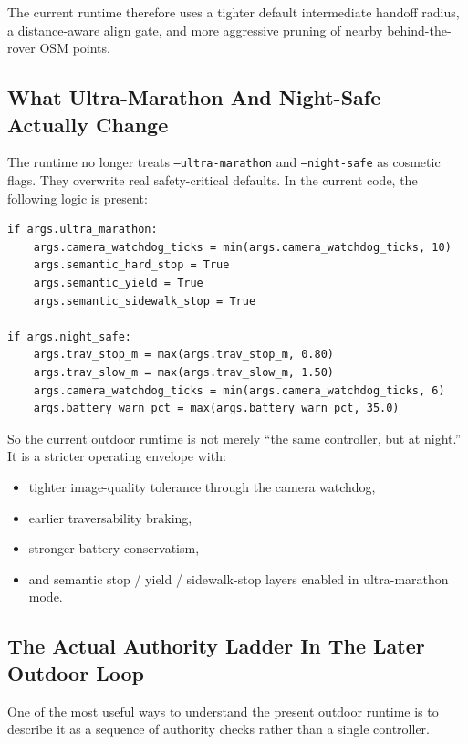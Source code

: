 \documentclass[11pt]{article}
\begin{document}
The current runtime therefore uses a tighter default intermediate handoff radius, a distance-aware align gate, and more aggressive pruning of nearby behind-the-rover OSM points.

\subsection*{What Ultra-Marathon And Night-Safe Actually Change}
The runtime no longer treats \texttt{--ultra-marathon} and \texttt{--night-safe} as cosmetic flags. They overwrite real safety-critical defaults. In the current code, the following logic is present:
\begin{verbatim}
if args.ultra_marathon:
    args.camera_watchdog_ticks = min(args.camera_watchdog_ticks, 10)
    args.semantic_hard_stop = True
    args.semantic_yield = True
    args.semantic_sidewalk_stop = True

if args.night_safe:
    args.trav_stop_m = max(args.trav_stop_m, 0.80)
    args.trav_slow_m = max(args.trav_slow_m, 1.50)
    args.camera_watchdog_ticks = min(args.camera_watchdog_ticks, 6)
    args.battery_warn_pct = max(args.battery_warn_pct, 35.0)
\end{verbatim}

So the current outdoor runtime is not merely ``the same controller, but at night.'' It is a stricter operating envelope with:
\begin{itemize}[leftmargin=*]
\item tighter image-quality tolerance through the camera watchdog,
\item earlier traversability braking,
\item stronger battery conservatism,
\item and semantic stop / yield / sidewalk-stop layers enabled in ultra-marathon mode.
\end{itemize}

\subsection*{The Actual Authority Ladder In The Later Outdoor Loop}
One of the most useful ways to understand the present outdoor runtime is to describe it as a sequence of authority checks rather than a single controller.
\end{document}
